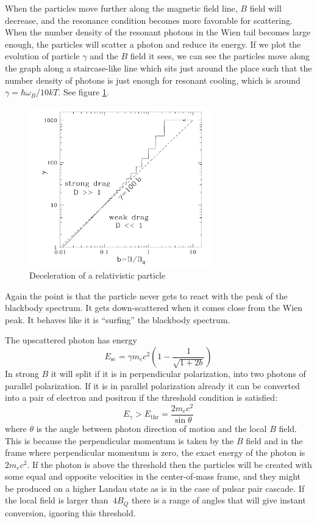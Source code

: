 \documentclass[letterpaper, 11pt]{article}
\numberwithin{equation}{section}
\numberwithin{figure}{section}
\begin{document}
When the particles move further along the magnetic field line, $B$ field will decrease, and the resonance condition becomes more favorable for scattering. When the number density of the resonant photons in the Wien tail becomes large enough, the particles will scatter a photon and reduce its energy. If we plot the evolution of particle $\gamma$ and the $B$ field it sees, we can see the particles move along the graph along a staircase-like line which sits just around the place such that the number density of photons is just enough for resonant cooling, which is around $\gamma = \hbar\omega_B/10 kT$. See figure \ref{fig:deceleration}.

\begin{figure}[h]
    \centering
    \includegraphics[width=0.7\textwidth]{deceleration.png}
    \caption{Deceleration of a relativistic particle}
    \label{fig:deceleration}
\end{figure}

Again the point is that the particle never gets to react with the peak of the blackbody spectrum. It gets down-scattered when it comes close from the Wien peak. It behaves like it is ``surfing'' the blackbody spectrum.

The upscattered photon has energy
\begin{equation}
    \label{eq:93}
    E_\mathrm{sc} = \gamma m_ec^2 \left( 1 - \frac{1}{\sqrt{1 + 2b}} \right)
\end{equation}
In strong $B$ it will split if it is in perpendicular polarization, into two photons of parallel polarization. If it is in parallel polarization already it can be converted into a pair of electron and positron if the threshold condition is satisfied:
\begin{equation}
    \label{eq:94}
    E_{\gamma} > E_\mathrm{thr} = \frac{2m_ec^2}{\sin\theta}
\end{equation}
where $\theta$ is the angle between photon direction of motion and the local $B$ field. This is because the perpendicular momentum is taken by the $B$ field and in the frame where perpendicular momentum is zero, the exact energy of the photon is $2m_ec^2$. If the photon is above the threshold then the particles will be created with some equal and opposite velocities in the center-of-mass frame, and they might be produced on a higher Landau state as is in the case of pulsar pair cascade. If the local field is larger than $~4B_Q$ there is a range of angles that will give instant conversion, ignoring this threshold.
\end{document}
